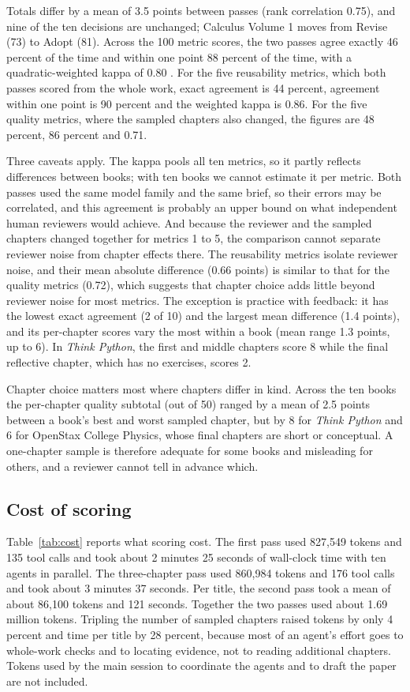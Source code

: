 Totals differ by a mean of 3.5 points between passes (rank correlation 0.75), and nine of the ten decisions are unchanged; Calculus Volume 1 moves from Revise (73) to Adopt (81). Across the 100 metric scores, the two passes agree exactly 46 percent of the time and within one point 88 percent of the time, with a quadratic-weighted kappa of 0.80 \cite{cohen1960,landis1977}. For the five reusability metrics, which both passes scored from the whole work, exact agreement is 44 percent, agreement within one point is 90 percent and the weighted kappa is 0.86. For the five quality metrics, where the sampled chapters also changed, the figures are 48 percent, 86 percent and 0.71.

Three caveats apply. The kappa pools all ten metrics, so it partly reflects differences between books; with ten books we cannot estimate it per metric. Both passes used the same model family and the same brief, so their errors may be correlated, and this agreement is probably an upper bound on what independent human reviewers would achieve. And because the reviewer and the sampled chapters changed together for metrics 1 to 5, the comparison cannot separate reviewer noise from chapter effects there. The reusability metrics isolate reviewer noise, and their mean absolute difference (0.66 points) is similar to that for the quality metrics (0.72), which suggests that chapter choice adds little beyond reviewer noise for most metrics. The exception is practice with feedback: it has the lowest exact agreement (2 of 10) and the largest mean difference (1.4 points), and its per-chapter scores vary the most within a book (mean range 1.3 points, up to 6). In \emph{Think Python}, the first and middle chapters score 8 while the final reflective chapter, which has no exercises, scores 2.

Chapter choice matters most where chapters differ in kind. Across the ten books the per-chapter quality subtotal (out of 50) ranged by a mean of 2.5 points between a book's best and worst sampled chapter, but by 8 for \emph{Think Python} and 6 for OpenStax College Physics, whose final chapters are short or conceptual. A one-chapter sample is therefore adequate for some books and misleading for others, and a reviewer cannot tell in advance which.

\subsection{Cost of scoring}
Table~\ref{tab:cost} reports what scoring cost. The first pass used 827{,}549 tokens and 135 tool calls and took about 2 minutes 25 seconds of wall-clock time with ten agents in parallel. The three-chapter pass used 860{,}984 tokens and 176 tool calls and took about 3 minutes 37 seconds. Per title, the second pass took a mean of about 86{,}100 tokens and 121 seconds. Together the two passes used about 1.69 million tokens. Tripling the number of sampled chapters raised tokens by only 4 percent and time per title by 28 percent, because most of an agent's effort goes to whole-work checks and to locating evidence, not to reading additional chapters. Tokens used by the main session to coordinate the agents and to draft the paper are not included.

